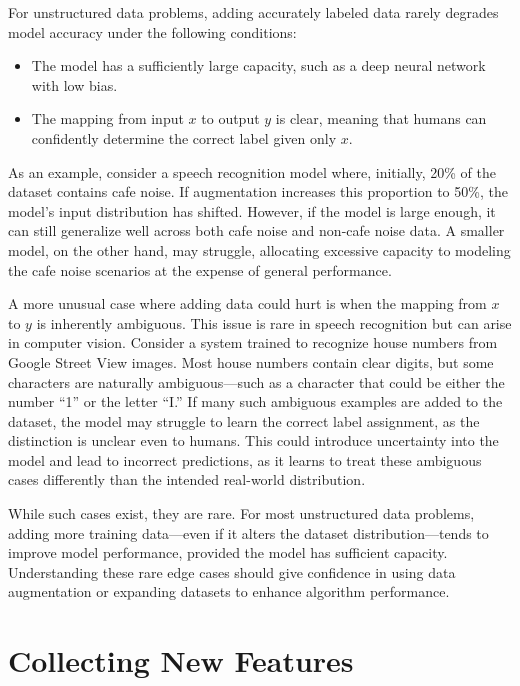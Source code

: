 \documentclass[12pt,openany, draft]{book}
\begin{document}
For unstructured data problems, adding accurately labeled data rarely degrades model accuracy under the following conditions:
\begin{itemize}
    \item The model has a sufficiently large capacity, such as a deep neural network with low bias.
    \item The mapping from input $x$ to output $y$ is clear, meaning that humans can confidently determine the correct label given only $x$.
\end{itemize}

As an example, consider a speech recognition model where, initially, 20\% of the dataset contains cafe noise. If augmentation increases this proportion to 50\%, the model’s input distribution has shifted. However, if the model is large enough, it can still generalize well across both cafe noise and non-cafe noise data. A smaller model, on the other hand, may struggle, allocating excessive capacity to modeling the cafe noise scenarios at the expense of general performance. \newline

A more unusual case where adding data could hurt is when the mapping from $x$ to $y$ is inherently ambiguous. This issue is rare in speech recognition but can arise in computer vision. Consider a system trained to recognize house numbers from Google Street View images. Most house numbers contain clear digits, but some characters are naturally ambiguous—such as a character that could be either the number “1” or the letter “I.” If many such ambiguous examples are added to the dataset, the model may struggle to learn the correct label assignment, as the distinction is unclear even to humans. This could introduce uncertainty into the model and lead to incorrect predictions, as it learns to treat these ambiguous cases differently than the intended real-world distribution. \newline

While such cases exist, they are rare. For most unstructured data problems, adding more training data—even if it alters the dataset distribution—tends to improve model performance, provided the model has sufficient capacity. Understanding these rare edge cases should give confidence in using data augmentation or expanding datasets to enhance algorithm performance.


\section{Collecting New Features}
\end{document}
